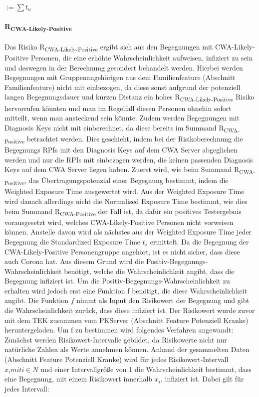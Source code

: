 \documentclass[conference]{IEEEtran}
\begin{document}
\centerline{\text{ }}
\centerline{  $ := \sum t_n$}
\centerline{\text{ }}
\paragraph{R\textsubscript{CWA-Likely-Positive}}
Das Risiko R\textsubscript{CWA-Likely-Positive} ergibt sich aus den Begegnungen mit CWA-Likely-Positive Personen, 
die eine erhöhte Wahrscheinlichkeit aufweisen, infiziert zu sein und deswegen in der Berechnung gesondert behandelt werden. 
Hierbei werden Begegnungen mit Gruppenangehörigen aus dem Familienfeature (Abschnitt Familienfeature) nicht mit einbezogen, 
da diese sonst aufgrund der potenziell langen Begegnungsdauer und 
kurzen Distanz ein hohes R\textsubscript{CWA-Likely-Positive} Risiko hervorrufen könnten und man im Regelfall diesen Personen ohnehin sofort mitteilt, wenn man ansteckend sein könnte. 
Zudem werden Begegnungen mit Diagnosis Keys nicht mit einberechnet, da diese bereits im Summand R\textsubscript{CWA-Positive} betrachtet werden. Dies geschieht, 
indem bei der Risikoberechnung die Begegnungs RPIs mit den Diagnosis Keys auf dem CWA Server abgeglichen werden und nur die RPIs mit einbezogen werden, 
die keinen passenden Diagnosis Keys auf dem CWA Server liegen haben.
Zuerst wird, wie beim Summand R\textsubscript{CWA-Positive}, das Übertragungspotenzial einer Begegnung bestimmt, indem die Weighted Exposure Time ausgewertet wird. 
Aus der Weighted Exposure Time wird danach allerdings nicht die Normalised Exposure Time bestimmt, wie dies beim Summand R\textsubscript{CWA-Positive} der Fall ist, 
da dafür ein positives Testergebnis vorausgesetzt wird, welches CWA-Likely-Positive Personen nicht vorweisen können.
Anstelle davon wird als nächstes aus der Weighted Exposure Time jeder Begegnung die Standardized Exposure Time $t_s$ ermittelt. 
Da die Begegnung der CWA-Likely-Positive Personengruppe angehört, ist es nicht sicher, dass diese auch Corona hat. 
Aus diesem Grund wird die Positiv-Begegnungs-Wahrscheinlichkeit benötigt, welche die Wahrscheinlichkeit angibt, dass die Begegnung infiziert ist. 
Um die Positiv-Begegnungs-Wahrscheinlichkeit zu erhalten wird jedoch erst eine Funktion f benötigt, die diese Wahrscheinlichkeit angibt. 
Die Funktion $f$ nimmt als Input den Risikowert der Begegnung und gibt die Wahrscheinlichkeit zurück, dass diese infiziert ist. 
Der Risikowert wurde zuvor mit dem TEK zusammen vom PKServer (Abschnitt Feature Potenziell Kranke) heruntergeladen. Um f zu bestimmen wird folgendes Verfahren angewandt:
Zunächst werden Risikowert-Intervalle gebildet, da Risikowerte nicht nur natürliche Zahlen als Werte annehmen können. 
Anhand der gesammelten Daten (Abschnitt Feature Potenziell Kranke) wird für jedes Risikowert-Intervall $x_i mit i \in N$ und einer Intervallgröße von 1 die Wahrscheinlichkeit bestimmt, 
dass eine Begegnung, mit einem Risikowert innerhalb $x_i$, infiziert ist. Dabei gilt für jedes Intervall:
\end{document}
